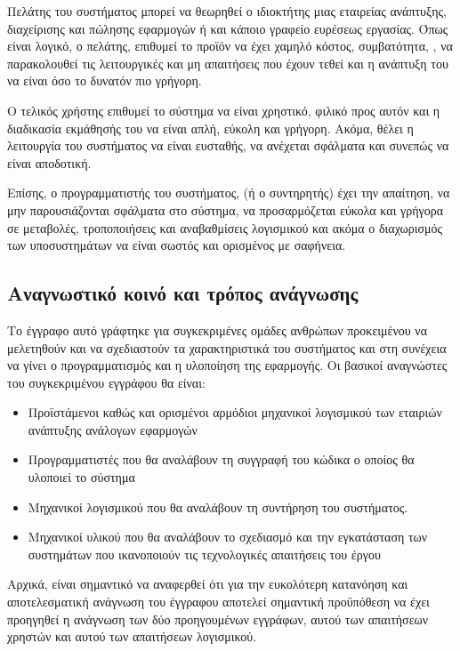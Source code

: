 Πελάτης του συστήματος μπορεί να θεωρηθεί ο ιδιοκτήτης μιας εταιρείας
ανάπτυξης, διαχείρισης και πώλησης εφαρμογών ή και κάποιο γραφείο
ευρέσεως εργασίας. Όπως είναι λογικό, ο πελάτης, επιθυμεί το προϊόν να
έχει χαμηλό κόστος, συμβατότητα, , να παρακολουθεί τις λειτουργικές
και μη απαιτήσεις που έχουν τεθεί και η ανάπτυξη του να είναι όσο το
δυνατόν πιο γρήγορη.

Ο τελικός χρήστης επιθυμεί το σύστημα να είναι χρηστικό, φιλικό προς
αυτόν και η διαδικασία εκμάθησής του να είναι απλή, εύκολη και
γρήγορη. Ακόμα, θέλει η λειτουργία του συστήματος να είναι ευσταθής,
να ανέχεται σφάλματα και συνεπώς να είναι αποδοτική.

Επίσης, ο προγραμματιστής του συστήματος, (ή ο συντηρητής) έχει την
απαίτηση, να μην παρουσιάζονται σφάλματα στο σύστημα, να προσαρμόζεται
εύκολα και γρήγορα σε μεταβολές, τροποποιήσεις και αναβαθμίσεις
λογισμικού και ακόμα ο διαχωρισμός των υποσυστημάτων να είναι σωστός
και ορισμένος με σαφήνεια.


\subsection{Αναγνωστικό κοινό και τρόπος ανάγνωσης}

Το έγγραφο αυτό γράφτηκε για συγκεκριμένες ομάδες ανθρώπων προκειμένου
να μελετηθούν και να σχεδιαστούν τα χαρακτηριστικά του συστήματος και
στη συνέχεια να γίνει ο προγραμματισμός και η υλοποίηση της
εφαρμογής. Οι βασικοί αναγνώστες του συγκεκριμένου εγγράφου θα είναι:
\begin{itemize}
	\item Προϊστάμενοι καθώς και ορισμένοι αρμόδιοι μηχανικοί
λογισμικού των εταιριών ανάπτυξης ανάλογων εφαρμογών
	\item Προγραμματιστές που θα αναλάβουν τη συγγραφή του κώδικα
ο οποίος θα υλοποιεί το σύστημα
	\item Μηχανικοί λογισμικού που θα αναλάβουν τη συντήρηση του
συστήματος.
	\item Μηχανικοί υλικού που θα αναλάβουν το σχεδιασμό και την
εγκατάσταση των συστημάτων που ικανοποιούν τις τεχνολογικές απαιτήσεις
του έργου
\end{itemize}

Αρχικά, είναι σημαντικό να αναφερθεί ότι για την ευκολότερη κατανόηση
και αποτελεσματική ανάγνωση του έγγραφου αποτελεί σημαντική προϋπόθεση
να έχει προηγηθεί η ανάγνωση των δύο προηγουμένων εγγράφων, αυτού των
απαιτήσεων χρηστών και αυτού των απαιτήσεων λογισμικού.

